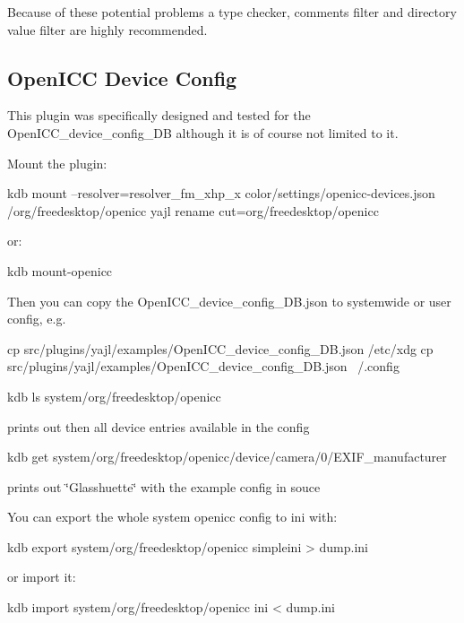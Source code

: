 Because of these potential problems a type checker, comments filter and directory value filter are highly recommended.

\subsection*{Open\+I\+C\+C Device Config}

This plugin was specifically designed and tested for the {\ttfamily Open\+I\+C\+C\+\_\+device\+\_\+config\+\_\+\+D\+B} although it is of course not limited to it.

Mount the plugin\+: \begin{DoxyVerb}    kdb mount --resolver=resolver_fm_xhp_x color/settings/openicc-devices.json /org/freedesktop/openicc yajl rename cut=org/freedesktop/openicc
\end{DoxyVerb}


or\+: \begin{DoxyVerb}    kdb mount-openicc
\end{DoxyVerb}


Then you can copy the Open\+I\+C\+C\+\_\+device\+\_\+config\+\_\+\+D\+B.\+json to systemwide or user config, e.\+g. \begin{DoxyVerb}    cp src/plugins/yajl/examples/OpenICC_device_config_DB.json /etc/xdg
    cp src/plugins/yajl/examples/OpenICC_device_config_DB.json ~/.config

    kdb ls system/org/freedesktop/openicc
\end{DoxyVerb}


prints out then all device entries available in the config \begin{DoxyVerb}    kdb get system/org/freedesktop/openicc/device/camera/0/EXIF_manufacturer
\end{DoxyVerb}


prints out \char`\"{}\+Glasshuette\char`\"{} with the example config in souce

You can export the whole system openicc config to ini with\+: \begin{DoxyVerb}    kdb export system/org/freedesktop/openicc simpleini > dump.ini
\end{DoxyVerb}


or import it\+: \begin{DoxyVerb}    kdb import system/org/freedesktop/openicc ini < dump.ini\end{DoxyVerb}
 